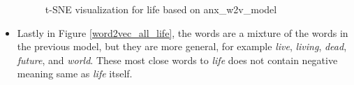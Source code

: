 \documentclass[12pt, a4paper]{article}
\begin{document}
\begin{itemize}
		\begin{figure}[H]
			\caption{t-SNE visualization for life based on anx\_w2v\_model}
			\label{word2vec_anxiety_life}
		\end{figure}
	
	
		\item Lastly in Figure \ref{word2vec_all_life}, the words are a mixture of the words in the previous model, but they are more general, for example \textit{live}, \textit{living}, \textit{dead}, \textit{future}, and \textit{world}. These most close words to \textit{life} does not contain negative meaning same as \textit{life} itself.	
		

\end{itemize}
\end{document}

